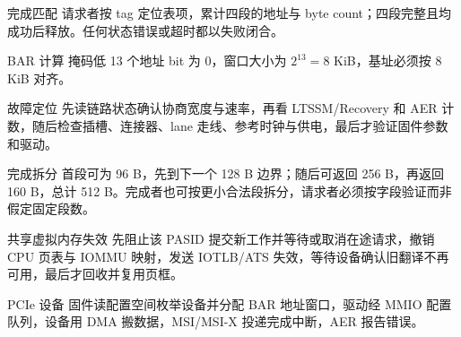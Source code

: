 \begin{chapteranswer}{完成匹配}
请求者按 tag 定位表项，累计四段的地址与 byte count；四段完整且均成功后释放。任何状态错误或超时都以失败闭合。
\end{chapteranswer}

\begin{chapteranswer}{BAR 计算}
掩码低 13 个地址 bit 为 0，窗口大小为 $2^{13}=8$ KiB，基址必须按 8 KiB 对齐。
\end{chapteranswer}

\begin{chapteranswer}{故障定位}
先读链路状态确认协商宽度与速率，再看 LTSSM/Recovery 和 AER 计数，随后检查插槽、连接器、lane 走线、参考时钟与供电，最后才验证固件参数和驱动。
\end{chapteranswer}

\begin{chapteranswer}{完成拆分}
首段可为 96 B，先到下一个 128 B 边界；随后可返回 256 B，再返回 160 B，总计 512 B。完成者也可按更小合法段拆分，请求者必须按字段验证而非假定固定段数。
\end{chapteranswer}

\begin{chapteranswer}{共享虚拟内存失效}
先阻止该 PASID 提交新工作并等待或取消在途请求，撤销 CPU 页表与 IOMMU 映射，发送 IOTLB/ATS 失效，等待设备确认旧翻译不再可用，最后才回收并复用页框。
\end{chapteranswer}

\begin{chapteranswer}{PCIe 设备}
固件读配置空间枚举设备并分配 BAR 地址窗口，驱动经 MMIO 配置队列，设备用 DMA 搬数据，MSI/MSI-X 投递完成中断，AER 报告错误。
\end{chapteranswer}
